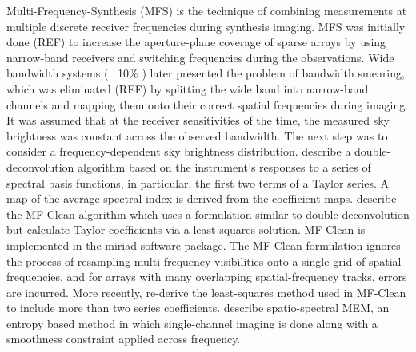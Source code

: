 \documentclass[structabstract]{stylefiles/aa}
\begin{document}
Multi-Frequency-Synthesis (MFS) is the technique of combining measurements at multiple
discrete receiver frequencies during synthesis imaging.
MFS was initially done (REF) to increase the aperture-plane coverage
of sparse arrays by using narrow-band receivers and switching frequencies during the observations.
Wide bandwidth systems ( ~10\% ) later presented the problem of bandwidth smearing, which was
eliminated (REF) by splitting the wide band into narrow-band channels and mapping them onto
their correct spatial frequencies during imaging. It was assumed that
at the receiver sensitivities of the time, 
the measured sky brightness was constant across the observed bandwidth.
The next step was to consider a frequency-dependent sky brightness distribution.
\citep{MFCLEAN_CCW} describe a double-deconvolution algorithm based on
the instrument's responses to a series of spectral basis functions, 
in particular, the first two terms of a Taylor series.
A map of the average spectral index is derived from the coefficient maps.
%
\citep{MFCLEAN} describe the MF-Clean algorithm which uses a formulation
similar to double-deconvolution but calculate Taylor-coefficients via a
least-squares solution. MF-Clean is implemented in the miriad software package.
The MF-Clean formulation ignores the process of resampling 
multi-frequency visibilities onto a single grid of spatial frequencies, and for 
arrays with many overlapping spatial-frequency tracks, errors are incurred.
More recently, \citet{LIKHACHEV} re-derive the least-squares method used
in MF-Clean to include more than two series coefficients.
\citep{SPATIOSPECTRALMEM} describe spatio-spectral 
MEM, an entropy based method in which single-channel imaging is done
along with a smoothness constraint applied across frequency.

%
%
\end{document}
